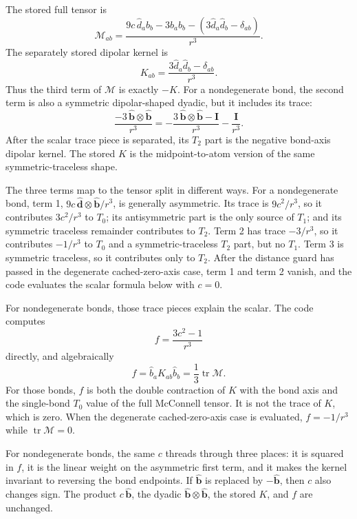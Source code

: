 \documentclass[11pt]{article}
\begin{document}
The stored full tensor is
\[
  \mathcal M_{ab} =
  \frac{
    9c\,\hat d_a b_b
    -3 b_a b_b
    -(3\hat d_a\hat d_b-\delta_{ab})}
  {r^3}.
\]
The separately stored dipolar kernel is
\[
  K_{ab}=\frac{3\hat d_a\hat d_b-\delta_{ab}}{r^3}.
\]
Thus the third term of \(\mathcal M\) is exactly \(-K\). For a
nondegenerate bond, the second term is also a symmetric dipolar-shaped dyadic,
but it includes its trace:
\[
  \frac{-3\,\hat{\bm b}\otimes\hat{\bm b}}{r^3}
  =
  -\frac{3\,\hat{\bm b}\otimes\hat{\bm b}-\bm I}{r^3}
  -\frac{\bm I}{r^3}.
\]
After the scalar trace piece is separated, its \(T_2\) part is the negative
bond-axis dipolar kernel. The stored \(K\) is the midpoint-to-atom version of
the same symmetric-traceless shape.

The three terms map to the tensor split in different ways. For a
nondegenerate bond, term 1,
\(9c\,\hat{\bm d}\otimes\hat{\bm b}/r^3\), is generally asymmetric. Its trace
is \(9c^2/r^3\), so it contributes \(3c^2/r^3\) to \(T_0\); its antisymmetric
part is the only source of \(T_1\); and its symmetric traceless remainder
contributes to \(T_2\). Term 2 has trace \(-3/r^3\), so it contributes
\(-1/r^3\) to \(T_0\) and a symmetric-traceless \(T_2\) part, but no \(T_1\).
Term 3 is symmetric traceless, so it contributes only to \(T_2\).
After the distance guard has passed in the degenerate cached-zero-axis case,
term 1 and term 2 vanish, and the code evaluates the scalar formula below with
\(c=0\).

For nondegenerate bonds, those trace pieces explain the scalar. The code
computes
\[
  f=\frac{3c^2-1}{r^3}
\]
directly, and algebraically
\[
  f = \hat b_a K_{ab}\hat b_b = \frac13\operatorname{tr}\mathcal M .
\]
For those bonds, \(f\) is both the double contraction of \(K\) with the bond
axis and the single-bond \(T_0\) value of the full McConnell tensor. It is not
the trace of \(K\), which is zero. When the degenerate cached-zero-axis case is
evaluated, \(f=-1/r^3\) while \(\operatorname{tr}\mathcal M=0\).

For nondegenerate bonds, the same \(c\) threads through three places: it is
squared in \(f\), it is the linear weight on the asymmetric first term, and it
makes the kernel invariant to reversing the bond endpoints. If
\(\hat{\bm b}\) is replaced by \(-\hat{\bm b}\), then \(c\) also changes sign.
The product \(c\,\hat{\bm b}\), the dyadic
\(\hat{\bm b}\otimes\hat{\bm b}\), the stored \(K\), and \(f\) are unchanged.
\end{document}

